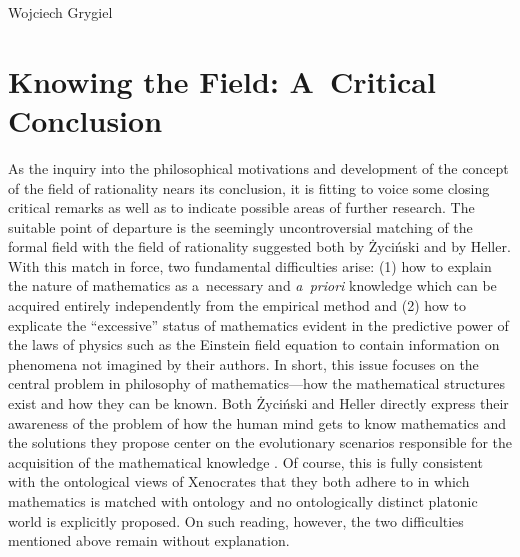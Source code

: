 \begin{artengenv}{Wojciech Grygiel}
\section{Knowing the Field: A~Critical Conclusion}
As the inquiry into the philosophical motivations and development of the concept of the field of rationality nears its conclusion, it is fitting to voice some closing critical remarks as well as to indicate possible areas of further research. The suitable point of departure is the seemingly uncontroversial matching of the formal field with the field of rationality suggested both by Życiński and by Heller. With this match in force, two fundamental difficulties arise: (1) how to explain the nature of mathematics as a~necessary and \textit{a~priori} knowledge which can be acquired entirely independently from the empirical method and (2) how to explicate the ``excessive'' status of mathematics evident in the predictive power of the laws of physics such as the Einstein field equation to contain information on phenomena not imagined by their authors. In short, this issue focuses on the central problem in philosophy of mathematics—how the mathematical structures exist and how they can be known. Both Życiński and Heller directly express their awareness of the problem of how the human mind gets to know mathematics and the solutions they propose center on the evolutionary scenarios responsible for the acquisition of the mathematical knowledge
\parencites[][]{heller_co_2010}[][]{heller_jak_2010}. %
 Of course, this is fully consistent with the ontological views of Xenocrates that they both adhere to in which mathematics is matched with ontology and no ontologically distinct platonic world is explicitly proposed. On such reading, however, the two difficulties mentioned above remain without explanation.


\end{artengenv}
